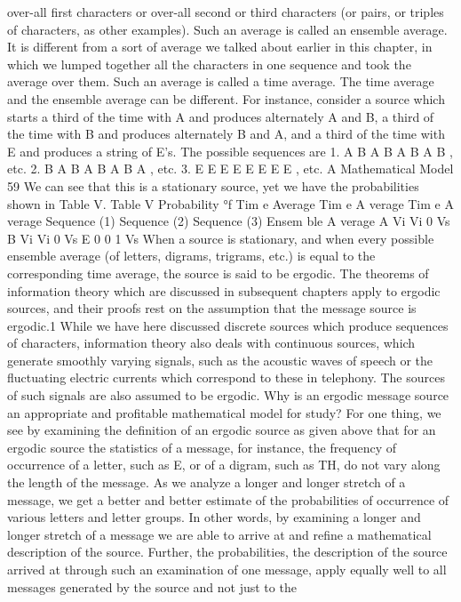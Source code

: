 over-all first characters or over-all second or third characters (or
pairs, or triples of characters, as other examples). Such an average
is called an ensemble average. It is different from a sort of average
we talked about earlier in this chapter, in which we lumped
together all the characters in one sequence and took the average
over them. Such an average is called a time average.
The time average and the ensemble average can be different.
For instance, consider a source which starts a third of the time with
A and produces alternately A and B, a third of the time with B and
produces alternately B and A, and a third of the time with E and
produces a string of E’s. The possible sequences are
1. A B A B A B A B , etc.
2. B A B A B A B A , etc.
3. E E E E E E E E , etc.
A Mathematical Model 59
We can see that this is a stationary source, yet we have the
probabilities shown in Table V.
Table V
Probability
°f
Tim e Average
Tim e A verage
Tim e A verage
Sequence (1)
Sequence (2)
Sequence (3)
Ensem ble
A verage
A Vi Vi 0 Vs
B Vi Vi 0 Vs
E 0 0 1 Vs
When a source is stationary, and when every possible ensemble
average (of letters, digrams, trigrams, etc.) is equal to the corresponding
time average, the source is said to be ergodic. The
theorems of information theory which are discussed in subsequent
chapters apply to ergodic sources, and their proofs rest on the
assumption that the message source is ergodic.1
While we have here discussed discrete sources which produce
sequences of characters, information theory also deals with continuous
sources, which generate smoothly varying signals, such as
the acoustic waves of speech or the fluctuating electric currents
which correspond to these in telephony. The sources of such signals
are also assumed to be ergodic.
Why is an ergodic message source an appropriate and profitable
mathematical model for study? For one thing, we see by examining
the definition of an ergodic source as given above that for an
ergodic source the statistics of a message, for instance, the frequency
of occurrence of a letter, such as E, or of a digram, such
as TH, do not vary along the length of the message. As we analyze
a longer and longer stretch of a message, we get a better and better
estimate of the probabilities of occurrence of various letters and
letter groups. In other words, by examining a longer and longer
stretch of a message we are able to arrive at and refine a mathematical
description of the source.
Further, the probabilities, the description of the source arrived
at through such an examination of one message, apply equally
well to all messages generated by the source and not just to the
